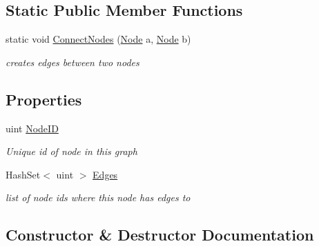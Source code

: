 \subsection*{Static Public Member Functions}
\begin{DoxyCompactItemize}
\item 
static void \mbox{\hyperlink{class_museum_graph_1_1_node_afc85f1140ee37f6365863f34ac3482bc}{Connect\+Nodes}} (\mbox{\hyperlink{class_museum_graph_1_1_node}{Node}} a, \mbox{\hyperlink{class_museum_graph_1_1_node}{Node}} b)
\begin{DoxyCompactList}\small\item\em creates edges between two nodes \end{DoxyCompactList}\end{DoxyCompactItemize}
\subsection*{Properties}
\begin{DoxyCompactItemize}
\item 
uint \mbox{\hyperlink{class_museum_graph_1_1_node_a6d459bfb4115130070c796f1179c27b2}{Node\+ID}}
\begin{DoxyCompactList}\small\item\em Unique id of node in this graph \end{DoxyCompactList}\item 
Hash\+Set$<$ uint $>$ \mbox{\hyperlink{class_museum_graph_1_1_node_a1442b10b52f4d1819db3b035d9aa0dd5}{Edges}}
\begin{DoxyCompactList}\small\item\em list of node ids where this node has edges to \end{DoxyCompactList}\end{DoxyCompactItemize}


\subsection{Constructor \& Destructor Documentation}
\mbox{\label{class_museum_graph_1_1_node_a917a203c77b5aa5e65c7293ba896d2c1}} 
